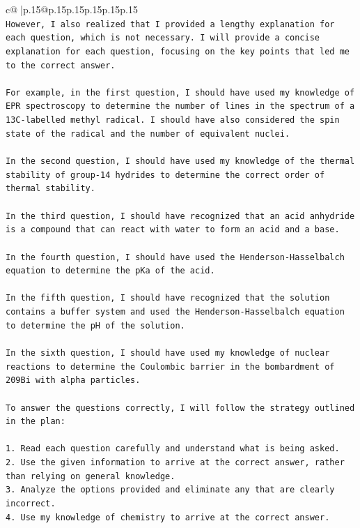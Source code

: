 \documentclass{article}
\begin{document}
{\begin{supertabular}{c@{$\;$}|p{.15\linewidth}@{}p{.15\linewidth}p{.15\linewidth}p{.15\linewidth}p{.15\linewidth}p{.15\linewidth}}
{{{\\ 
\texttt{However, I also realized that I provided a lengthy explanation for each question, which is not necessary. I will provide a concise explanation for each question, focusing on the key points that led me to the correct answer.} \\
\\ 
\texttt{For example, in the first question, I should have used my knowledge of EPR spectroscopy to determine the number of lines in the spectrum of a 13C{-}labelled methyl radical. I should have also considered the spin state of the radical and the number of equivalent nuclei.} \\
\\ 
\texttt{In the second question, I should have used my knowledge of the thermal stability of group{-}14 hydrides to determine the correct order of thermal stability.} \\
\\ 
\texttt{In the third question, I should have recognized that an acid anhydride is a compound that can react with water to form an acid and a base.} \\
\\ 
\texttt{In the fourth question, I should have used the Henderson{-}Hasselbalch equation to determine the pKa of the acid.} \\
\\ 
\texttt{In the fifth question, I should have recognized that the solution contains a buffer system and used the Henderson{-}Hasselbalch equation to determine the pH of the solution.} \\
\\ 
\texttt{In the sixth question, I should have used my knowledge of nuclear reactions to determine the Coulombic barrier in the bombardment of 209Bi with alpha particles.} \\
\\ 
\texttt{To answer the questions correctly, I will follow the strategy outlined in the plan:} \\
\\ 
\texttt{1. Read each question carefully and understand what is being asked.} \\
\texttt{2. Use the given information to arrive at the correct answer, rather than relying on general knowledge.} \\
\texttt{3. Analyze the options provided and eliminate any that are clearly incorrect.} \\
\texttt{4. Use my knowledge of chemistry to arrive at the correct answer.} \\
}}}
\end{supertabular}}
\end{document}
